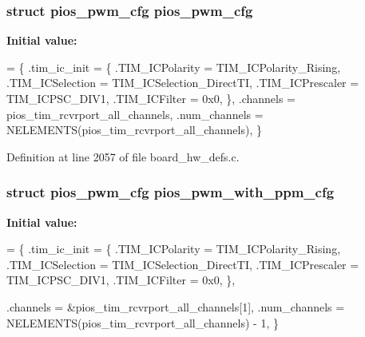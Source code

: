 \hypertarget{group___tau_labs_core_ga7587f8e174df90bef8cec1edfa9e14c1}{
\subsubsection[{pios\-\_\-pwm\-\_\-cfg}]{\setlength{\rightskip}{0pt plus 5cm}struct {\bf pios\-\_\-pwm\-\_\-cfg} {\bf pios\-\_\-pwm\-\_\-cfg}}}\label{group___tau_labs_core_ga7587f8e174df90bef8cec1edfa9e14c1}
{\bfseries Initial value\-:}
\begin{DoxyCode}
= \{
        .tim\_ic\_init = \{
                .TIM\_ICPolarity = TIM\_ICPolarity\_Rising,
                .TIM\_ICSelection = TIM\_ICSelection\_DirectTI,
                .TIM\_ICPrescaler = TIM\_ICPSC\_DIV1,
                .TIM\_ICFilter = 0x0,
        \},
        .channels = pios\_tim\_rcvrport\_all\_channels,
        .num\_channels = NELEMENTS(pios\_tim\_rcvrport\_all\_channels),
\}
\end{DoxyCode}


Definition at line 2057 of file board\-\_\-hw\-\_\-defs.\-c.

\hypertarget{group___tau_labs_core_ga6a7a8338c617f18384f3b3c5678f5505}{
\subsubsection[{pios\-\_\-pwm\-\_\-with\-\_\-ppm\-\_\-cfg}]{\setlength{\rightskip}{0pt plus 5cm}struct {\bf pios\-\_\-pwm\-\_\-cfg} pios\-\_\-pwm\-\_\-with\-\_\-ppm\-\_\-cfg}}\label{group___tau_labs_core_ga6a7a8338c617f18384f3b3c5678f5505}
{\bfseries Initial value\-:}
\begin{DoxyCode}
= \{
        .tim\_ic\_init = \{
                .TIM\_ICPolarity = TIM\_ICPolarity\_Rising,
                .TIM\_ICSelection = TIM\_ICSelection\_DirectTI,
                .TIM\_ICPrescaler = TIM\_ICPSC\_DIV1,
                .TIM\_ICFilter = 0x0,
        \},
        
        .channels = &pios\_tim\_rcvrport\_all\_channels[1],
        .num\_channels = NELEMENTS(pios\_tim\_rcvrport\_all\_channels) - 1,
\}
\end{DoxyCode}


